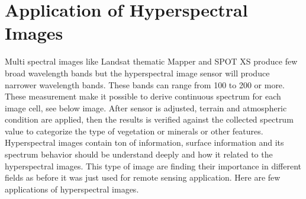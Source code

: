 \documentclass[document.tex]{subfiles}
\begin{document}
\section{Application of Hyperspectral Images}
Multi spectral images like Landsat thematic Mapper and SPOT XS produce few broad wavelength bands but the hyperspectral image sensor will produce narrower wavelength bands. These bands can range from 100 to 200 or more. These measurement make it possible to derive continuous spectrum for each image cell, see below image. After sensor is adjusted, terrain and atmospheric condition are applied, then the results is verified against the collected spectrum value to categorize the type of vegetation or minerals or other features. Hyperspectral images contain ton of information, surface information and its spectrum behavior should be understand deeply and how it related to the hyperspectral images. This type of image are finding their importance in different fields as before it was just used for remote sensing application. Here are few applications of hyperspectral images.
\end{document}
